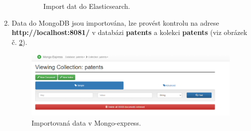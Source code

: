 \begin{enumerate}
\begin{itemize}
\begin{figure}[H]
		\caption{Import dat do Elasticsearch.}
		\label{fig:elastic_import}
		\end{figure}
	\end{itemize}
\item Data do MongoDB jsou importována, lze provést kontrolu na adrese \textbf{http://localhost:8081/} v databázi \textbf{patents} a kolekci \textbf{patents} (viz obrázek č. \ref{fig:mongo_done_import}).
		\begin{figure}[H]
		\centering
		\includegraphics[width=15cm]{img/manual/mongo_import_done}
		\caption{Importovaná data v Mongo-express.}
		\label{fig:mongo_done_import}
		\end{figure}
\end{enumerate}